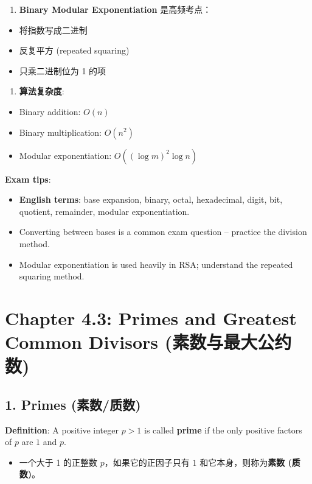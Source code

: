 \documentclass[10pt,a4paper,openany]{ctexbook}
\theoremstyle{definition}
\theoremstyle{remark}
\begin{document}
\begin{enumerate}
\item \textbf{Binary Modular Exponentiation} 是高频考点：
\end{enumerate}

\begin{itemize}
\item 将指数写成二进制
\item 反复平方 (repeated squaring)
\item 只乘二进制位为 1 的项

\end{itemize}

\begin{enumerate}
\item \textbf{算法复杂度}:
\end{enumerate}

\begin{itemize}
\item Binary addition: $O(n)$
\item Binary multiplication: $O(n^2)$
\item Modular exponentiation: $O((\log m)^2 \log n)$

\end{itemize}

\textbf{Exam tips}:
\begin{itemize}
\item \textbf{English terms}: base expansion, binary, octal, hexadecimal, digit, bit, quotient, remainder, modular exponentiation.
\item Converting between bases is a common exam question -- practice the division method.
\item Modular exponentiation is used heavily in RSA; understand the repeated squaring method.

\end{itemize}


\section{Chapter 4.3: Primes and Greatest Common Divisors (素数与最大公约数)}

\vspace{-2pt}

\subsection{1. Primes (素数/质数)}

\textbf{Definition}: A positive integer $p > 1$ is called \textbf{prime} if the only positive factors of $p$ are $1$ and $p$.
\begin{itemize}
\item 一个大于 1 的正整数 $p$，如果它的正因子只有 $1$ 和它本身，则称为\textbf{素数 (质数)}。

\end{itemize}
\end{document}
